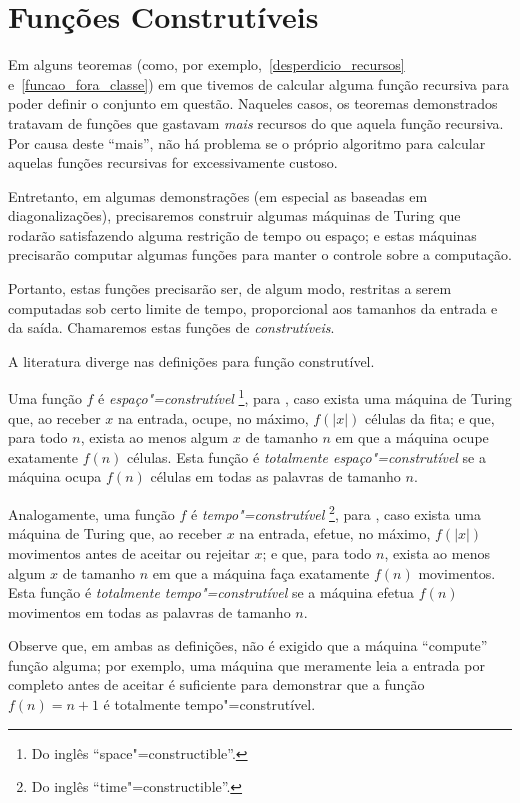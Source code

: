 \section{Funções Construtíveis}
\label{funcoes_construtiveis}

Em alguns teoremas
(como, por exemplo,~\ref{desperdicio_recursos} e~\ref{funcao_fora_classe})
em que tivemos de calcular alguma função recursiva
para poder definir o conjunto em questão.
Naqueles casos,
os teoremas demonstrados tratavam de funções
que gastavam \emph{mais} recursos do que aquela função recursiva.
Por causa deste ``mais'',
não há problema
se o próprio algoritmo para calcular aquelas funções recursivas
for excessivamente custoso.

Entretanto,
em algumas demonstrações
(em especial as baseadas em diagonalizações),
precisaremos construir algumas máquinas de Turing
que rodarão satisfazendo alguma restrição de tempo ou espaço;
e estas máquinas precisarão computar algumas funções
para manter o controle sobre a computação.

Portanto,
estas funções precisarão ser,
de algum modo,
restritas a serem computadas sob certo limite de tempo,
proporcional aos tamanhos da entrada e da saída.
Chamaremos estas funções de \emph{construtíveis}.

A literatura diverge nas definições para função construtível.

Uma função $f$ é \emph{espaço"=construtível}
\footnote{
    Do inglês ``space"=constructible''.
}, para
,
caso exista uma máquina de Turing que,
ao receber $x$ na entrada,
ocupe, no máximo, $f(|x|)$ células da fita;
e que, para todo $n$, exista ao menos algum $x$ de tamanho $n$
em que a máquina ocupe exatamente $f(n)$ células.
Esta função é \emph{totalmente espaço"=construtível}
se a máquina ocupa $f(n)$ células em todas as palavras de tamanho $n$.

Analogamente, uma função $f$ é \emph{tempo"=construtível}
\footnote{
    Do inglês ``time"=constructible''.
}, para
,
caso exista uma máquina de Turing que,
ao receber $x$ na entrada,
efetue, no máximo, $f(|x|)$ movimentos antes de aceitar ou rejeitar $x$;
e que, para todo $n$, exista ao menos algum $x$ de tamanho $n$
em que a máquina faça exatamente $f(n)$ movimentos.
Esta função é \emph{totalmente tempo"=construtível}
se a máquina efetua $f(n)$ movimentos em todas as palavras de tamanho $n$.

Observe que,
em ambas as definições,
não é exigido que a máquina ``compute'' função alguma;
por exemplo,
uma máquina que meramente leia a entrada por completo antes de aceitar
é suficiente para demonstrar que a função $f(n) = n+1$
é totalmente tempo"=construtível.

